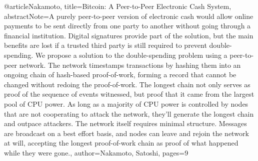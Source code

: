 {{ @article{Nakamoto, title={Bitcoin: A Peer-to-Peer Electronic Cash System}, abstractNote={A purely peer-to-peer version of electronic cash would allow online payments to be sent directly from one party to another without going through a financial institution. Digital signatures provide part of the solution, but the main benefits are lost if a trusted third party is still required to prevent double-spending. We propose a solution to the double-spending problem using a peer-to-peer network. The network timestamps transactions by hashing them into an ongoing chain of hash-based proof-of-work, forming a record that cannot be changed without redoing the proof-of-work. The longest chain not only serves as proof of the sequence of events witnessed, but proof that it came from the largest pool of CPU power. As long as a majority of CPU power is controlled by nodes that are not cooperating to attack the network, they’ll generate the longest chain and outpace attackers. The network itself requires minimal structure. Messages are broadcast on a best effort basis, and nodes can leave and rejoin the network at will, accepting the longest proof-of-work chain as proof of what happened while they were gone.}, author={Nakamoto, Satoshi}, pages={9} }
}}
